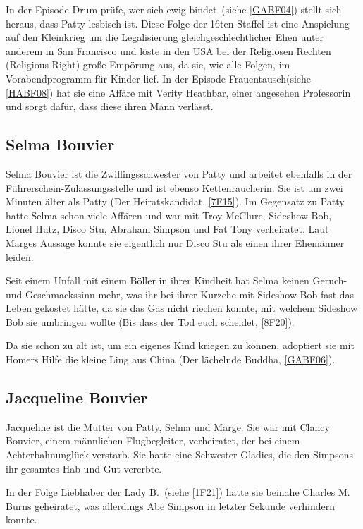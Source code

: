 In der Episode \glqq Drum prüfe, wer sich ewig bindet\grqq\ (siehe \ref{GABF04}) stellt sich heraus, dass Patty lesbisch ist. Diese Folge der 16ten Staffel ist eine Anspielung auf den Kleinkrieg um die Legalisierung gleichgeschlechtlicher Ehen unter anderem in San Francisco und löste in den USA bei der Religiösen Rechten (\glqq Religious Right\grqq ) große Empörung aus, da sie, wie alle Folgen, im Vorabendprogramm für Kinder lief. In der Episode \glqq Frauentausch\grqq (siehe \ref{HABF08}) hat sie eine Affäre mit Verity Heathbar, einer angesehen Professorin und sorgt dafür, dass diese ihren Mann verlässt.


\subsection{Selma Bouvier}\label{SelmaBouvier}
Selma Bouvier ist die Zwillingsschwester von Patty und arbeitet ebenfalls in der Führerschein-Zulassungsstelle und ist ebenso Kettenraucherin. Sie ist um zwei Minuten älter als Patty (\glqq Der Heiratskandidat\grqq , \ref{7F15}). Im Gegensatz zu Patty hatte Selma schon viele Affären und war mit Troy McClure, Sideshow Bob, Lionel Hutz, Disco Stu, Abraham Simpson und Fat Tony verheiratet. Laut Marges Aussage konnte sie eigentlich nur Disco Stu als einen ihrer Ehemänner leiden.

Seit einem Unfall mit einem Böller in ihrer Kindheit hat Selma keinen Geruch- und Geschmackssinn mehr, was ihr bei ihrer Kurzehe mit Sideshow Bob fast das Leben gekostet hätte, da sie das Gas nicht riechen konnte, mit welchem Sideshow Bob sie umbringen wollte (\glqq Bis dass der Tod euch scheidet\grqq , \ref{8F20}).

Da sie schon zu alt ist, um ein eigenes Kind kriegen zu können, adoptiert sie mit Homers Hilfe die kleine Ling aus China (\glqq Der lächelnde Buddha\grqq , \ref{GABF06}).


\subsection{Jacqueline Bouvier}\label{JacquelineBouvier}
Jacqueline ist die Mutter von Patty, Selma und Marge. Sie war mit Clancy Bouvier, einem männlichen Flugbegleiter, verheiratet, der bei einem Achterbahnunglück verstarb. Sie hatte eine Schwester Gladies, die den Simpsons ihr gesamtes Hab und Gut vererbte.

In der Folge \glqq Liebhaber der Lady B.\grqq\ (siehe \ref{1F21}) hätte sie beinahe Charles M. Burns geheiratet, was allerdings Abe Simpson in letzter Sekunde verhindern konnte.

